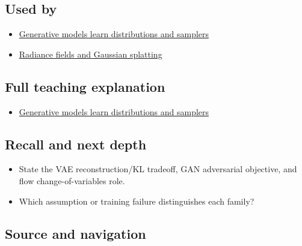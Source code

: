 \subsection{Used by}\label{appendix-2c568f05ee34-used-by}

\begin{itemize}
\tightlist
\item
  \hyperref[04-visual-computing-ii-ch031-generative-models-learn-distributions-and-samplers]{Generative models learn distributions and samplers}
\item
  \hyperref[appendix-c5b332e400e7]{Radiance fields and Gaussian splatting}
\end{itemize}

\subsection{Full teaching explanation}\label{appendix-2c568f05ee34-full-teaching-explanation}

\begin{itemize}
\tightlist
\item
  \hyperref[04-visual-computing-ii-ch031-generative-models-learn-distributions-and-samplers]{Generative models learn distributions and samplers}
\end{itemize}

\subsection{Recall and next depth}\label{appendix-2c568f05ee34-recall-and-next-depth}

\begin{itemize}
\tightlist
\item
  State the VAE reconstruction/KL tradeoff, GAN adversarial objective, and flow change-of-variables role.
\item
  Which assumption or training failure distinguishes each family?
\end{itemize}

\subsection{Source and navigation}\label{appendix-2c568f05ee34-source-and-navigation}

